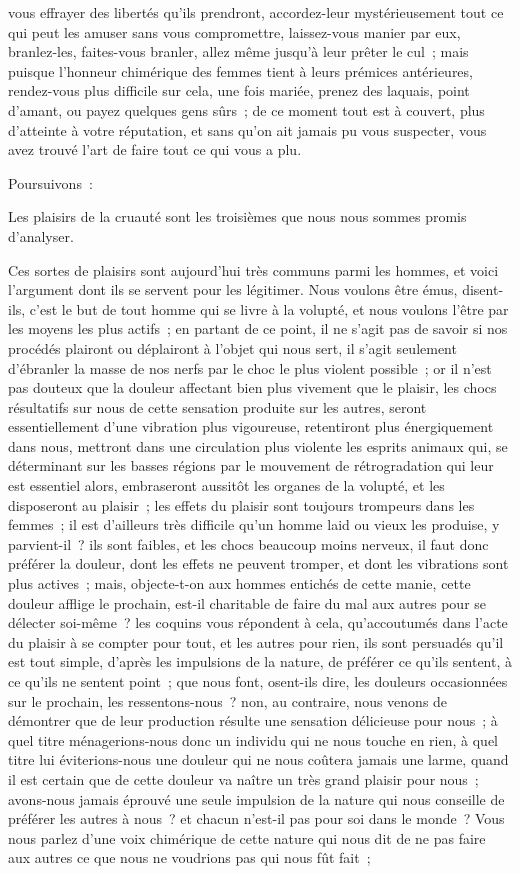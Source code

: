 \documentclass[french,twoside]{book} %
\begin{document}
vous effrayer des libertés qu’ils prendront, accordez-leur mystérieusement tout ce qui peut les amuser sans vous compromettre, laissez-vous manier par eux, branlez-les, faites-vous branler, allez même jusqu’à leur prêter le cul ; mais puisque l’honneur chimérique des femmes tient à leurs prémices antérieures, rendez-vous plus difficile sur cela, une fois mariée, prenez des laquais, point d’amant, ou payez quelques gens sûrs ; de ce moment tout est à couvert, plus d’atteinte à votre réputation, et sans qu’on ait jamais pu vous suspecter, vous avez trouvé l’art de faire tout ce qui vous a plu.\par
Poursuivons :\par
Les plaisirs de la cruauté sont les troisièmes que nous nous sommes promis d’analyser.\par
Ces sortes de plaisirs sont aujourd’hui très communs parmi les hommes, et voici l’argument dont ils se servent pour les légitimer. Nous voulons être émus, disent-ils, c’est le but de tout homme qui se livre à la volupté, et nous voulons l’être par les moyens les plus actifs ; en partant de ce point, il ne s’agit pas de savoir si nos procédés plairont ou déplairont à l’objet qui nous sert, il s’agit seulement d’ébranler la masse de nos nerfs par le choc le plus violent possible ; or il n’est pas douteux que la douleur affectant bien plus vivement que le plaisir, les chocs résultatifs sur nous de cette sensation produite sur les autres, seront essentiellement d’une vibration plus vigoureuse, retentiront plus énergiquement dans nous, mettront dans une circulation plus violente les esprits animaux qui, se déterminant sur les basses régions par le mouvement de rétrogradation qui leur est essentiel alors, embraseront aussitôt les organes de la volupté, et les disposeront au plaisir ; les effets du plaisir sont toujours trompeurs dans les femmes ; il est d’ailleurs très difficile qu’un homme laid ou vieux les produise, y parvient-il ? ils sont faibles, et les chocs beaucoup moins nerveux, il faut donc préférer la douleur, dont les effets ne peuvent tromper, et dont les vibrations sont plus actives ; mais, objecte-t-on aux hommes entichés de cette manie, cette douleur afflige le prochain, est-il charitable de faire du mal aux autres pour se délecter soi-même ? les coquins vous répondent à cela, qu’accoutumés dans l’acte du plaisir à se compter pour tout, et les autres pour rien, ils sont persuadés qu’il est tout simple, d’après les impulsions de la nature, de préférer ce qu’ils sentent, à ce qu’ils ne sentent point ; que nous font, osent-ils dire, les douleurs occasionnées sur le prochain, les ressentons-nous ? non, au contraire, nous venons de démontrer que de leur production résulte une sensation délicieuse pour nous ; à quel titre ménagerions-nous donc un individu qui ne nous touche en rien, à quel titre lui éviterions-nous une douleur qui ne nous coûtera jamais une larme, quand il est certain que de cette douleur va naître un très grand plaisir pour nous ; avons-nous jamais éprouvé une seule impulsion de la nature qui nous conseille de préférer les autres à nous ? et chacun n’est-il pas pour soi dans le monde ? Vous nous parlez d’une voix chimérique de cette nature qui nous dit de ne pas faire aux autres ce que nous ne voudrions pas qui nous fût fait ; 
\end{document}
